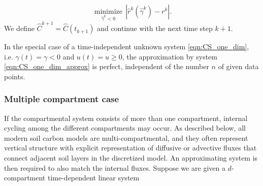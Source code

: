 \documentclass[11pt,a4paper]{article}
\newcommand{\deriv}[1]{\frac{\mathrm{d}}{\mathrm{d}#1}}
\begin{document}
        \begin{equation*}
            \underset{\widehat{\gamma}^k<0}{\operatorname{minimize}}\,|\widehat{r}^k(\widehat{\gamma}^k)-r^k|.
        \end{equation*}
        We define $\widehat{C}^{k+1}=\widehat{C}(t_{k+1})$ and continue with the next time step $k+1$.
        
        In the special case of a time-independent unknown system \eqref{eqn:CS_one_dim}, i.e. $\gamma(t)=\gamma<0$ and $u(t)=u\geq0$, the approximation by system \eqref{eqn:CS_one_dim_approx} is perfect, independent of the number $n$ of given data points.\\
        
    \subsubsection*{Multiple compartment case}
        If the compartmental system consists of more than one compartment, internal cycling among the different compartments may occur. As described below, all modern soil carbon models are multi-compartmental, and they often represent vertical structure with explicit representation of diffusive or advective fluxes that connect adjacent soil layers in the discretized model.
        An approximating system is then required to also match the internal fluxes.
        Suppose we are given a $d$-compartment time-dependent linear system
\end{document}
